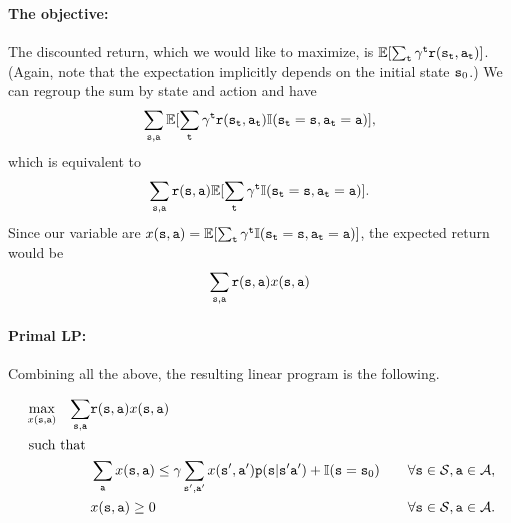 \paragraph{The objective:}
The discounted return, which we would like to maximize, is
$\mathbb{E}[\sum_{\tt t}
\gamma^{\tt t}{\tt r}({\tt s}_{\tt t},{\tt a}_{\tt t}) ]$. (Again, note that the expectation implicitly depends on the initial state ${\tt s}_0$.) We can
regroup the sum by state and action and have
\[
\sum_{{\tt s},{\tt a}}\mathbb{E}[\sum_{\tt t}
\gamma^{\tt t}{\tt r}({\tt s}_{\tt t},{\tt a}_{\tt t})\mathbb{I}({\tt s}_{\tt t}={\tt s},{\tt a}_{\tt t}={\tt a})],
\]
which is equivalent to 
\[
\sum_{{\tt s},{\tt a}}{\tt r}({\tt s},{\tt a})
\mathbb{E}[\sum_{\tt t}
\gamma^{\tt t}\mathbb{I}({\tt s}_{\tt t}={\tt s},{\tt a}_{\tt t}={\tt a})].
\]
Since our variable are $x({\tt s},{\tt a})=\mathbb{E}[\sum_{\tt t}
\gamma^{\tt t}\mathbb{I}({\tt s}_{\tt t}={\tt s},{\tt a}_{\tt t}={\tt a})]$, the expected return would be
\[
\sum_{{\tt s},{\tt a}} {\tt r}({\tt s},{\tt a})x({\tt s},{\tt a})
\]

\paragraph{Primal LP:}
Combining all the above, the resulting linear program is the following.

\begin{align*}
\max_{x(\state,\action)}\;\;\; \sum_{\state,\action}&
\reward(\state,\action)x(\state,\action)\\
\mbox{ such that }&\\
%
&\sum_{\action} x(\state,\action)\leq \discount
\sum_{\state',\action'} x(\state',\action')\transitionprob(\state|\state'\action')+\I(\state=\state_0)
&\quad\forall \state \in {\States}, \action\in\Actions,\\
%
%
&x(\state,\action) \geq 0  &\quad\forall \state \in {\States},
\action\in\Actions.
%
%
\end{align*}



